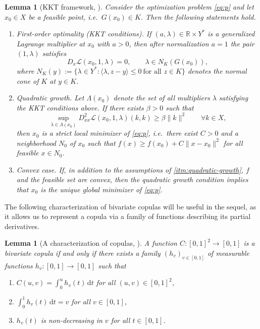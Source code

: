 \documentclass{article}
\newtheorem{lemma}[theorem]{Lemma}
\newcommand{\1}{\mathds{1}}
\newcommand{\de}{\mathrm{\,d}}
\newcommand{\R}{\mathbb{R}}
\begin{document}
\begin{lemma}[KKT framework, \cite{bonnans2013perturbation,rockel2025exact}]\label{lem:KKT-framework}
Consider the optimization problem \eqref{eq:p} and let $x_0\in X$ be a feasible point, i.e.\ $G(x_0)\in K$. Then the following statements hold.

\begin{enumerate}[label=(\roman*)]
\item \label{itm:first-order-optimality}\emph{First-order optimality (KKT conditions).}
If $(a,\lambda)\in \R\times Y^*$ is a generalized Lagrange multiplier at $x_0$ with $a>0$, then after normalization $a=1$ the pair $(1,\lambda)$ satisfies
\[
D_x\mathcal{L}(x_0,1,\lambda)=0,
\qquad
\lambda\in N_K(G(x_0)),
\]
where
\(
N_K(y)
:=
\{\lambda\in Y^*:\langle \lambda,z-y\rangle\le0\ \text{for all } z\in K\}
\)
denotes the normal cone of $K$ at $y\in K$.

\item \label{itm:quadratic-growth}\emph{Quadratic growth.}
Let $\Lambda(x_0)$ denote the set of all multipliers $\lambda$ satisfying the KKT conditions above. 
If there exists $\beta>0$ such that
\[
\sup_{\lambda\in\Lambda(x_0)}
D^2_{xx}\mathcal{L}(x_0,1,\lambda)(k,k)
\ge \beta\|k\|^2
\qquad
\forall k\in X,
\]
then $x_0$ is a strict local minimizer of \eqref{eq:p}, i.e.\ there exist $C>0$ and a neighborhood $N_0$ of $x_0$ such that
\(
f(x)\ge f(x_0)+C\|x-x_0\|^2
\)
for all feasible $x\in N_0$.

\item \label{itm:convex-case}\emph{Convex case.}
If, in addition to the assumptions of \ref{itm:quadratic-growth}, $f$ and the feasible set are convex, then the quadratic growth condition implies that $x_0$ is the unique global minimizer of \eqref{eq:p}.
\end{enumerate}
\end{lemma}

The following characterization of bivariate copulas will be useful in the sequel, as it allows us to represent a copula via a family of functions describing its partial derivatives.

\begin{lemma}[A characterization of copulas, \cite{ansari2025exact}]
\label{charSIcop}
A function \(C\colon [0,1]^2 \to [0,1]\) is a bivariate copula if and only if there exists a family \((h_v)_{v\in [0,1]}\) of measurable functions \(h_v\colon [0,1]\to [0,1]\) such that
\begin{enumerate}[label=(\roman*)]
\item \label{charSIcop1} \(C(u,v) = \int_0^u h_v(t) \de t\) for all \((u,v)\in [0,1]^2\),
\item \label{charSIcop3} \(\int_0^1 h_v(t) \de t = v\) for all \(v\in [0,1]\),
\item \label{charSIcop2} \(h_v(t)\) is non-decreasing in \(v\) for all \(t\in [0,1]\).
\end{enumerate}
\end{lemma}
\end{document}
